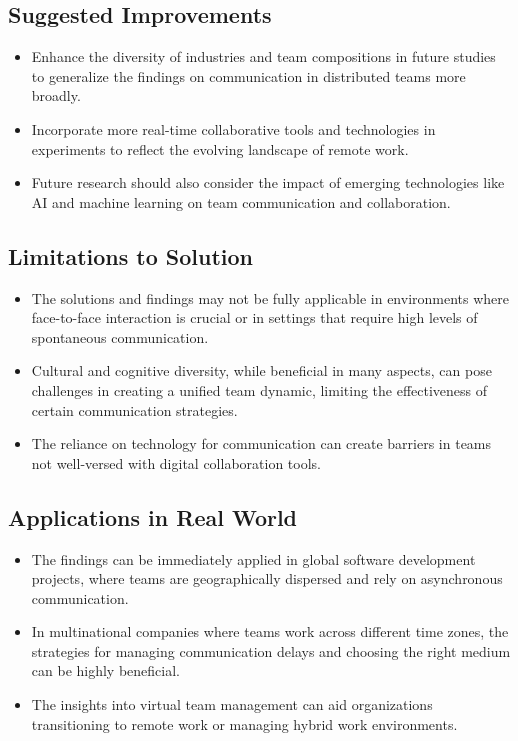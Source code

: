\documentclass[12pt]{article}
\begin{document}
\subsection{Suggested Improvements}
\begin{itemize}
  \item Enhance the diversity of industries and team compositions in future studies to generalize the findings on communication in distributed teams more broadly.
  \item Incorporate more real-time collaborative tools and technologies in experiments to reflect the evolving landscape of remote work.
  \item Future research should also consider the impact of emerging technologies like AI and machine learning on team communication and collaboration.
\end{itemize}

\subsection{Limitations to Solution}
\begin{itemize}
  \item The solutions and findings may not be fully applicable in environments where face-to-face interaction is crucial or in settings that require high levels of spontaneous communication.
  \item Cultural and cognitive diversity, while beneficial in many aspects, can pose challenges in creating a unified team dynamic, limiting the effectiveness of certain communication strategies.
  \item The reliance on technology for communication can create barriers in teams not well-versed with digital collaboration tools.
\end{itemize}

\subsection{Applications in Real World}
\begin{itemize}
  \item The findings can be immediately applied in global software development projects, where teams are geographically dispersed and rely on asynchronous communication.
  \item In multinational companies where teams work across different time zones, the strategies for managing communication delays and choosing the right medium can be highly beneficial.
  \item The insights into virtual team management can aid organizations transitioning to remote work or managing hybrid work environments.
\end{itemize}
\end{document}
